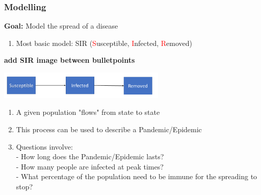 \documentclass{beamer}
\begin{document}
\begin{frame}
	\frametitle{Modelling}
	\textbf{Goal:} Model the spread of a disease
	\begin{enumerate}[$\bullet$]
		\item Most basic model: SIR (\textcolor{red}{S}usceptible, \textcolor{red}{I}nfected, \textcolor{red}{R}emoved)\\
	\end{enumerate}
	
	\textbf{add SIR image between bulletpoints}
	\begin{center}
		\includegraphics[width=0.6\textwidth]{./images/SIRv2.png} %
	\end{center}
	\begin{enumerate}[$\bullet$]
		\item A given population "flows" from state to state
		\item This process can be used to describe a Pandemic/Epidemic 
		\item Questions involve:\\
			- How long does the Pandemic/Epidemic lasts?\\
			- How many people are infected at peak times?\\
			- What percentage of the population need to be immune for the spreading to stop?
	\end{enumerate}
\end{frame}
\end{document}
